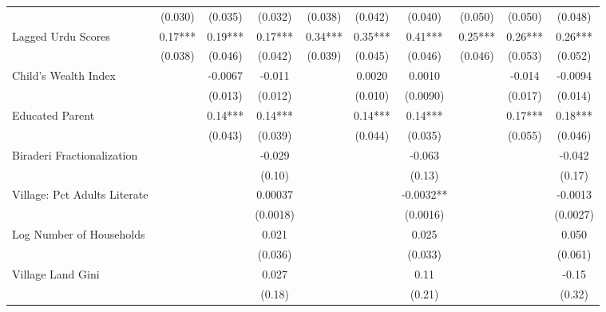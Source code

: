 \begin{sidewaystable}[htbp]
\begin{tabular}{l*{9}{c}}
                &  (0.030)   &  (0.035)   &  (0.032)   &  (0.038)   &  (0.042)   &  (0.040)   &  (0.050)   &  (0.050)   &  (0.048)   \\
Lagged Urdu Scores&     0.17***&     0.19***&     0.17***&     0.34***&     0.35***&     0.41***&     0.25***&     0.26***&     0.26***\\
                &  (0.038)   &  (0.046)   &  (0.042)   &  (0.039)   &  (0.045)   &  (0.046)   &  (0.046)   &  (0.053)   &  (0.052)   \\
Child's Wealth Index&            &  -0.0067   &   -0.011   &            &   0.0020   &   0.0010   &            &   -0.014   &  -0.0094   \\
                &            &  (0.013)   &  (0.012)   &            &  (0.010)   & (0.0090)   &            &  (0.017)   &  (0.014)   \\
Educated Parent &            &     0.14***&     0.14***&            &     0.14***&     0.14***&            &     0.17***&     0.18***\\
                &            &  (0.043)   &  (0.039)   &            &  (0.044)   &  (0.035)   &            &  (0.055)   &  (0.046)   \\
Biraderi Fractionalization&            &            &   -0.029   &            &            &   -0.063   &            &            &   -0.042   \\
                &            &            &   (0.10)   &            &            &   (0.13)   &            &            &   (0.17)   \\
Village: Pct Adults Literate&            &            &  0.00037   &            &            &  -0.0032** &            &            &  -0.0013   \\
                &            &            & (0.0018)   &            &            & (0.0016)   &            &            & (0.0027)   \\
Log Number of Households&            &            &    0.021   &            &            &    0.025   &            &            &    0.050   \\
                &            &            &  (0.036)   &            &            &  (0.033)   &            &            &  (0.061)   \\
Village Land Gini&            &            &    0.027   &            &            &     0.11   &            &            &    -0.15   \\
                &            &            &   (0.18)   &            &            &   (0.21)   &            &            &   (0.32)   \\

\end{tabular}
\end{sidewaystable}
